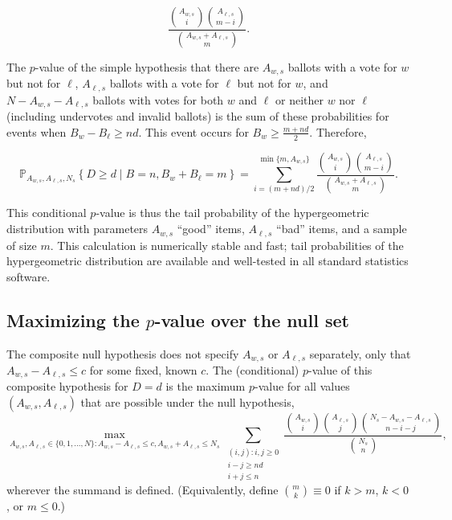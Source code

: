 $$\frac{{A_{w,s} \choose i}{A_{\ell, s} \choose m-i}}{{A_{w,s}+A_{\ell,s} \choose m}}.$$

The $p$-value of the simple hypothesis that there are $A_{w,s}$ ballots with
a vote for $w$ but not for $\ell$, $A_{\ell,s}$ ballots with a vote for $\ell$ but not for $w$, 
and $N - A_{w,s} - A_{\ell,s}$ ballots with votes for both $w$ and $\ell$ or neither $w$ nor $\ell$ 
(including undervotes and
invalid ballots) is the sum of these probabilities for events when $B_w - B_\ell \geq nd$.
This event occurs for $B_w \geq \frac{m+nd}{2}$.
Therefore,

\begin{equation}
   \mathbb{P}_{A_{w,s}, A_{\ell,s}, N_s} \left \{ D \geq d \;\vert\; B = n, B_w+B_\ell = m \right \} = 
   \sum_{i=(m+nd)/2}^{\min\{m, A_{w,s}\}} \frac{{A_{w,s} \choose i}{A_{\ell, s} \choose m-i}}{{A_{w,s}+A_{\ell,s} \choose m}}.
\end{equation}


This conditional $p$-value is thus the tail probability of the hypergeometric distribution
with parameters $A_{w,s}$ ``good'' items, $A_{\ell,s}$ ``bad'' items, and a sample of size $m$.
This calculation is numerically stable and fast; tail probabilities of the hypergeometric distribution are available
and well-tested in all standard statistics software.

\subsection{Maximizing the $p$-value over the null set}

The composite null hypothesis does not specify $A_{w,s}$ or $A_{\ell,s}$ separately, only 
that $A_{w,s} - A_{\ell,s} \le c$ for
some fixed, known $c$.
The (conditional) $p$-value of this composite hypothesis for $D=d$ is the maximum $p$-value for all
values $(A_{w,s}, A_{\ell,s})$ that are possible under the null hypothesis,
\begin{equation}
  \max_{A_{w,s}, A_{\ell,s} \in \{0, 1, \ldots, N \}: A_{w,s} - A_{\ell,s} \le c, A_{w,s} + A_{\ell,s} \le N_s}
   \sum_{\substack{(i, j) :  i, j\ge 0 \\ i-j \geq nd \\ i+j \leq n}} \frac{ {A_{w,s } \choose i}{A_{\ell,s} \choose j}{N_s - A_{w,s} - A_{\ell,s} \choose n-i-j}}{{N_s \choose n}},
\end{equation}
wherever the summand is defined. 
(Equivalently, define ${m \choose k} \equiv 0$ if $k > m$, $k < 0$, or $m \le 0$.)


